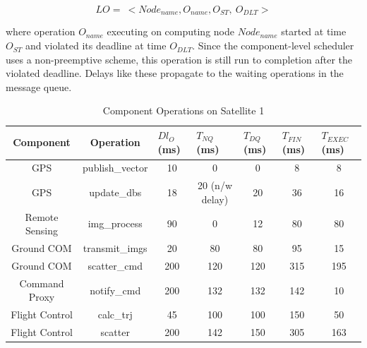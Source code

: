 \vspace{-0.1in}
\begin{equation}
\label{eq:DLV}
LO = \ <Node_{name}, O_{name}, O_{ST}, \ O_{DLT}>
\end{equation}

where operation $O_{name}$ executing on computing node $Node_{name}$ started at time $O_{ST}$ and violated its deadline at time $O_{DLT}$. Since the component-level scheduler uses a non-preemptive scheme, this operation is still run to completion after the violated deadline. Delays like these propagate to the waiting operations in the message queue.

\begin{table}[t]
	\caption{Component Operations on Satellite 1}
	\label{table:AR}
	\begin{center}
		\begin{tabular}{ | c | p{2.0cm} | p{1.7cm} | p{1.7cm} | p{1.7cm} | p{1.9cm} | p{1.9cm} |}
			\hline
			Component & \multicolumn{1}{|c|}{Operation} & $Dl_{O}$ (ms) & $T_{NQ}$ (ms) & $T_{DQ}$ (ms) & $T_{FIN}$ (ms) & $T_{EXEC}$ (ms) \\ \hline
			GPS & \multicolumn{1}{|c|}{publish\_vector} & \multicolumn{1}{|c|}{10} & \multicolumn{1}{|c|}{0} & \multicolumn{1}{|c|}{0} & \multicolumn{1}{|c|}{8} & \multicolumn{1}{|c|}{8} \\ \hline
			GPS & \multicolumn{1}{|c|}{update\_dbs} & \multicolumn{1}{|c|}{18} & \multicolumn{1}{|c|}{20 (n/w delay)} & \multicolumn{1}{|c|}{20} & \multicolumn{1}{|c|}{36} & \multicolumn{1}{|c|}{16} \\ \hline
			Remote Sensing & \multicolumn{1}{|c|}{img\_process} & \multicolumn{1}{|c|}{90} & \multicolumn{1}{|c|}{0} & \multicolumn{1}{|c|}{12} & \multicolumn{1}{|c|}{80} & \multicolumn{1}{|c|}{80} \\ \hline
			Ground COM & \multicolumn{1}{|c|}{transmit\_imgs} & \multicolumn{1}{|c|}{20} & \multicolumn{1}{|c|}{80} & \multicolumn{1}{|c|}{80} & \multicolumn{1}{|c|}{95} & \multicolumn{1}{|c|}{15} \\ \hline
			Ground COM & \multicolumn{1}{|c|}{scatter\_cmd} & \multicolumn{1}{|c|}{200} & \multicolumn{1}{|c|}{120} & \multicolumn{1}{|c|}{120} & \multicolumn{1}{|c|}{315} & \multicolumn{1}{|c|}{195} \\ \hline
			Command Proxy & \multicolumn{1}{|c|}{notify\_cmd} & \multicolumn{1}{|c|}{200} & \multicolumn{1}{|c|}{132} & \multicolumn{1}{|c|}{132} & \multicolumn{1}{|c|}{142} & \multicolumn{1}{|c|}{10} \\ \hline
			Flight Control & \multicolumn{1}{|c|}{calc\_trj} & \multicolumn{1}{|c|}{45} & \multicolumn{1}{|c|}{100} & \multicolumn{1}{|c|}{100} & \multicolumn{1}{|c|}{150} & \multicolumn{1}{|c|}{50} \\ \hline
			Flight Control & \multicolumn{1}{|c|}{scatter} & \multicolumn{1}{|c|}{200} & \multicolumn{1}{|c|}{142} & \multicolumn{1}{|c|}{150} & \multicolumn{1}{|c|}{305} & \multicolumn{1}{|c|}{163} \\ \hline
			
			
		\end{tabular}
	\end{center}
	\vspace{-0.2in}
\end{table}


